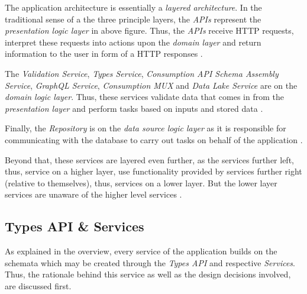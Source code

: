 The application architecture is essentially a \emph{layered architecture}. In the traditional sense of a the three principle layers, the \emph{APIs} represent the \emph{presentation logic layer} in above figure. Thus, the \emph{APIs} receive HTTP requests, interpret these requests into actions upon the \emph{domain layer} and return information to the user in form of a HTTP responses \cite{AppArchitecture}.\par
The \emph{Validation Service}, \emph{Types Service}, \emph{Consumption API Schema Assembly Service}, \emph{GraphQL Service}, \emph{Consumption MUX} and \emph{Data Lake Service} are on the \emph{domain logic layer}. Thus, these services validate data that comes in from the \emph{presentation layer} and perform tasks based on inputs and stored data \cite{AppArchitecture}.\par
Finally, the \emph{Repository} is on the \emph{data source logic layer} as it is responsible for communicating with the database to carry out tasks on behalf of the application \cite{AppArchitecture}.\par
Beyond that, these services are layered even further, as the services further left, thus, service on a higher layer, use functionality provided by services further right (relative to themselves), thus, services on a lower layer. But the lower layer services are unaware of the higher level services \cite{AppArchitecture}.

\subsection{Types API \& Services} \label{sec:Types API & Services}
As explained in the overview, every service of the application builds on the schemata which may be created through the \emph{Types API} and respective \emph{Services}. Thus, the rationale behind this service as well as the design decisions involved, are discussed first.\par

